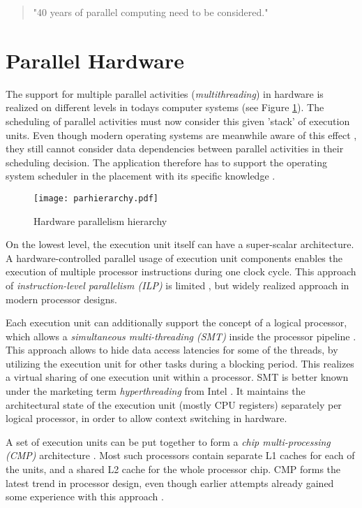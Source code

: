 \documentclass[a4paper]{article}
\begin{document}
\begin{quotation}
"40 years of parallel computing need to be considered." 
\end{quotation}

\section{Parallel Hardware}

The support for multiple parallel activities (\emph{multithreading}) in hardware is realized on different levels in todays computer systems (see Figure \ref{fig:parhierarchy}). The scheduling of parallel activities must now consider this given 'stack' of execution units. Even though modern operating systems are meanwhile aware of this effect \cite{hyperthreadingos}, they still cannot consider data dependencies between parallel activities in their scheduling decision. The application therefore has to support the operating system scheduler in the placement with its specific knowledge \cite{cmt}. 

\begin{figure}
\centering
\texttt{[image: parhierarchy.pdf]}
\caption{Hardware parallelism hierarchy}
\label{fig:parhierarchy}
\end{figure}

On the lowest level, the execution unit itself can have a super-scalar architecture. A hardware-controlled parallel usage of execution unit components enables the execution of multiple processor instructions during one clock cycle. This approach of \emph{instruction-level parallelism (ILP)} is limited \cite{emer:single-vs-multi:ieee-micro:2007}, but widely realized approach in modern processor designs. 

Each execution unit can additionally support the concept of a logical processor, which allows a \emph{simultaneous multi-threading (SMT)} inside the processor pipeline \cite{224449,10.1109/40.621209}. This approach allows to hide data access latencies for some of the threads, by utilizing the execution unit for other tasks during a blocking period. This realizes a virtual sharing of one execution unit within a processor. SMT is better known under the marketing term \emph{hyperthreading} from Intel \cite{hyperthreading}. It maintains the architectural state of the execution unit (mostly CPU registers) separately per logical processor, in order to allow context switching in hardware. 

A set of execution units can be put together to form a \emph{chip multi-processing (CMP)} architecture \cite{mcdougall:sw-scaling:acmqueue:2005}. Most such processors contain separate L1 caches for each of the units, and a shared L2 cache for the whole processor chip. CMP forms the latest trend in processor design, even though earlier attempts already gained some experience with this approach \cite{mtproc}. 
\end{document}
